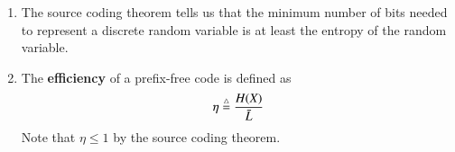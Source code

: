 \documentclass[journal,12pt,twocolumn]{IEEEtran}
\renewcommand\thesection{\arabic{section}}
\begin{document}
\begin{enumerate}[label=\thesection.\arabic*, ref=\thesection.\theenumi]
\begin{proof}
        To prove the upper bound, choose codewords for each symbol $x$ satisfying
        \begin{align}
            2^{-l(x)} \le p(x) \le 2^{-l(x) + 1}
            \label{eq:src-len-cond}
        \end{align}
        Consider the left hand side of \eqref{eq:src-len-cond}. Summing over all symbols,
        \begin{align}
            \sum_{x\in\mathcal{X}}2^{-l(x)} \le \sum_{x\in\mathcal{X}}p(x) = 1
            \label{eq:src-kraft}
        \end{align}
        This satisfies the Kraft inequality, hence such a codeword can be selected.
        Now, considering the right hand side of \eqref{eq:src-len-cond}, taking 
        logarithms gives
        \begin{align}
            \log p(x) < 1 - l(x) \\
            \implies \log p(x) + l(x) < 1
            \label{eq:src-len-bound}
        \end{align} 
        Thus, using \eqref{eq:src-len-bound},
        \begin{align}
            \bar{L} - H(X) &= \sum_{x\in\mathcal{X}}p(x)\brak{l(x) + \log p(x)} \\
            &< \sum_{x\in\mathcal{X}}p(x) = 1
        \end{align}
        which proves the upper bound.
    \end{proof}
    \item The source coding theorem tells us that the minimum number of bits 
    needed to represent a discrete random variable is at least the entropy of 
    the random variable.
    \item The \textbf{efficiency} of a prefix-free code is defined as 
    \begin{align}
        \eta \stackrel{\triangle}{=} \frac{H(X)}{\bar{L}}
        \label{eq:efficiency-code}
    \end{align}
    Note that $\eta \le 1$ by the source coding theorem.
\end{enumerate}
\end{document}
